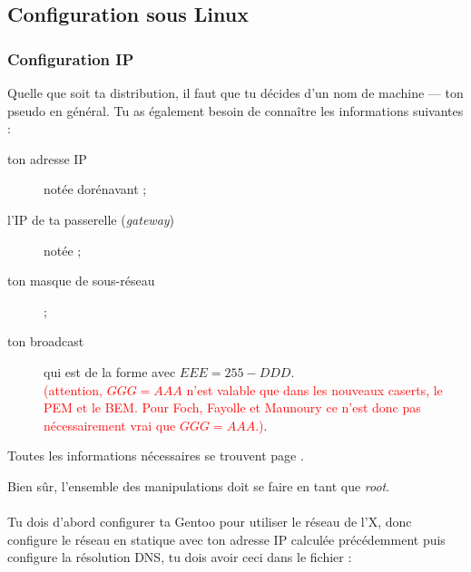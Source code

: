 


\subsection{Configuration sous Linux}

\subsubsection{Configuration IP}
Quelle que soit ta distribution, il faut que tu décides d'un nom de
machine --- ton pseudo en général. Tu as également besoin de
conna\^itre les informations suivantes :
\begin{description}
  \item [ton adresse IP] notée dorénavant  ;
  \item [l'IP de ta passerelle (\emph{gateway})] notée  ;
  \item [ton masque de sous-réseau]  ;
  \item [ton broadcast] qui est de la forme  avec $EEE = 255 - DDD$. \\
        \textcolor{red}{(attention, $GGG = AAA$ n'est valable que dans les nouveaux caserts, le PEM et le BEM. Pour Foch, Fayolle et Maunoury ce n'est donc pas nécessairement vrai que $GGG =
        AAA$.)}.
\end{description}

Toutes les informations nécessaires se trouvent page
\pageref{calcul_ip}.

Bien sûr, l'ensemble des manipulations doit se faire en tant que \emph{root}.


\paragraph{}

Tu dois d'abord configurer ta Gentoo pour utiliser le réseau de l'X, donc configure le réseau en statique avec ton adresse IP calculée précédemment puis
configure la résolution DNS, tu dois avoir ceci dans le fichier  :
\noindent {}

